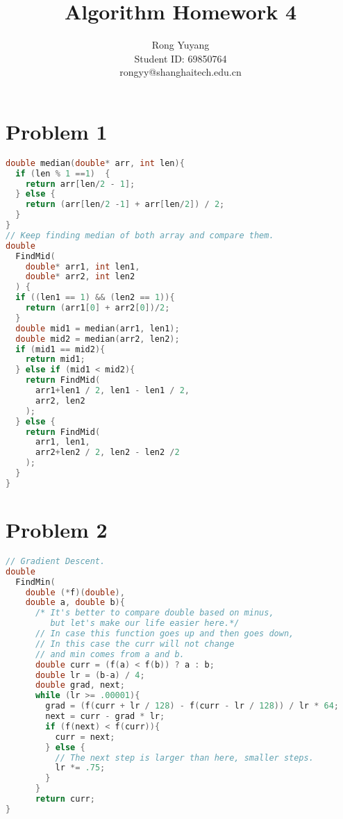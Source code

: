 \documentclass{article}
\title{Algorithm Homework 4}
\author{Rong Yuyang \\ Student ID: 69850764 \\ rongyy@shanghaitech.edu.cn}
\begin{document}
\maketitle

\section*{Problem 1}
\begin{lstlisting}[language = C++]
double median(double* arr, int len){
  if (len % 1 ==1)  {
    return arr[len/2 - 1];
  } else {
    return (arr[len/2 -1] + arr[len/2]) / 2;
  }
}
// Keep finding median of both array and compare them.
double 
  FindMid(
    double* arr1, int len1,
    double* arr2, int len2
  ) {
  if ((len1 == 1) && (len2 == 1)){
    return (arr1[0] + arr2[0])/2;
  }
  double mid1 = median(arr1, len1);
  double mid2 = median(arr2, len2);
  if (mid1 == mid2){
    return mid1;
  } else if (mid1 < mid2){
    return FindMid(
      arr1+len1 / 2, len1 - len1 / 2,
      arr2, len2
    );
  } else {
    return FindMid(
      arr1, len1,
      arr2+len2 / 2, len2 - len2 /2
    );
  }
}
\end{lstlisting}
\section*{Problem 2}
\begin{lstlisting}[language = C++]
// Gradient Descent.
double 
  FindMin(
    double (*f)(double), 
    double a, double b){
      /* It's better to compare double based on minus, 
         but let's make our life easier here.*/
      // In case this function goes up and then goes down, 
      // In this case the curr will not change 
      // and min comes from a and b.
      double curr = (f(a) < f(b)) ? a : b;
      double lr = (b-a) / 4;
      double grad, next;
      while (lr >= .00001){
        grad = (f(curr + lr / 128) - f(curr - lr / 128)) / lr * 64;
        next = curr - grad * lr;
        if (f(next) < f(curr)){
          curr = next;
        } else {
          // The next step is larger than here, smaller steps.
          lr *= .75;
        }
      }
      return curr;
}
\end{lstlisting}
\end{document}
